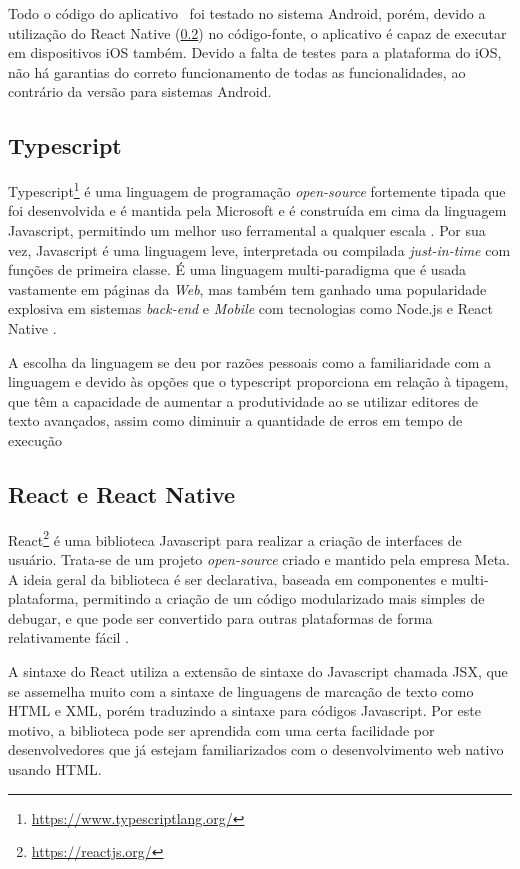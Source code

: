 Todo o código do aplicativo \appName\ foi testado no sistema Android, porém, devido a utilização do React Native (\ref{react-section}) no código-fonte, o aplicativo é capaz de executar em dispositivos iOS também. Devido a falta de testes para a plataforma do iOS, não há garantias do correto funcionamento de todas as funcionalidades, ao contrário da versão para sistemas Android.

\subsection{Typescript}

Typescript\footnote{\url{https://www.typescriptlang.org/}} é uma linguagem de programação \textit{open-source} fortemente tipada que foi desenvolvida e é mantida pela Microsoft e é construída em cima da linguagem Javascript, permitindo um melhor uso ferramental a qualquer escala \cite{typescript}. Por sua vez, Javascript é uma linguagem leve, interpretada ou compilada \textit{just-in-time} com funções de primeira classe. É uma linguagem multi-paradigma que é usada vastamente em páginas da \textit{Web}, mas também tem ganhado uma popularidade explosiva em sistemas \textit{back-end} e \textit{Mobile} com tecnologias como Node.js e React Native \cite{javascript}.

A escolha da linguagem se deu por razões pessoais como a familiaridade com a linguagem e devido às opções que o typescript proporciona em relação à tipagem, que têm a capacidade de aumentar a produtividade ao se utilizar editores de texto avançados, assim como diminuir a quantidade de erros em tempo de execução

\subsection{React e React Native}
\label{react-section}

React\footnote{\url{https://reactjs.org/}} é uma biblioteca Javascript para realizar a criação de interfaces de usuário. Trata-se de um projeto \textit{open-source} criado e mantido pela empresa Meta. A ideia geral da biblioteca é ser declarativa, baseada em componentes e multi-plataforma, permitindo a criação de um código modularizado mais simples de debugar, e que pode ser convertido para outras plataformas de forma relativamente fácil \cite{react}.

A sintaxe do React utiliza a extensão de sintaxe do Javascript chamada JSX, que se assemelha muito com a sintaxe de linguagens de marcação de texto como HTML e XML, porém traduzindo a sintaxe para códigos Javascript. Por este motivo, a biblioteca pode ser aprendida com uma certa facilidade por desenvolvedores que já estejam familiarizados com o desenvolvimento web nativo usando HTML.

